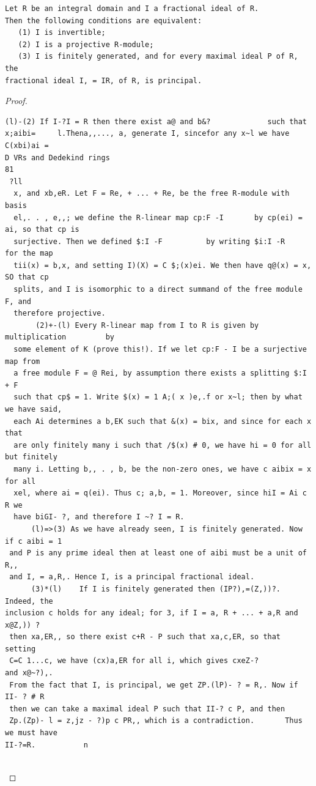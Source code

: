 \begin{theorem}\label{mcrt-auto-theorem-11-3}\uses{}
\begin{verbatim}
Let R be an integral domain and I a fractional ideal of R.
Then the following conditions are equivalent:
   (1) I is invertible;
   (2) I is a projective R-module;
   (3) I is finitely generated, and for every maximal ideal P of R, the
fractional ideal I, = IR, of R, is principal.
\end{verbatim}
\end{theorem}
\begin{proof}
\begin{verbatim}
(l)-(2) If I-?I = R then there exist a@ and b&?             such that
x;aibi=     l.Thena,,..., a, generate I, sincefor any x~l we have C(xbi)ai =
D VRs and Dedekind rings                                                 81
 ?ll
  x, and xb,eR. Let F = Re, + ... + Re, be the free R-module with basis
  el,. . , e,,; we define the R-linear map cp:F -I       by cp(ei) = ai, so that cp is
  surjective. Then we defined $:I -F          by writing $i:I -R         for the map
  tii(x) = b,x, and setting I)(X) = C $;(x)ei. We then have q@(x) = x, SO that cp
  splits, and I is isomorphic to a direct summand of the free module F, and
  therefore projective.
       (2)+-(l) Every R-linear map from I to R is given by multiplication         by
  some element of K (prove this!). If we let cp:F - I be a surjective map from
  a free module F = @ Rei, by assumption there exists a splitting $:I + F
  such that cp$ = 1. Write $(x) = 1 A;( x )e,.f or x~l; then by what we have said,
  each Ai determines a b,EK such that &(x) = bix, and since for each x that
  are only finitely many i such that /$(x) # 0, we have hi = 0 for all but finitely
  many i. Letting b,, . , b, be the non-zero ones, we have c aibix = x for all
  xel, where ai = q(ei). Thus c; a,b, = 1. Moreover, since hiI = Ai c R we
  have biGI- ?, and therefore I ~? I = R.
      (l)=>(3) As we have already seen, I is finitely generated. Now if c aibi = 1
 and P is any prime ideal then at least one of aibi must be a unit of R,,
 and I, = a,R,. Hence I, is a principal fractional ideal.
      (3)*(l)    If I is finitely generated then (IP?),=(Z,))?.         Indeed, the
inclusion c holds for any ideal; for 3, if I = a, R + ... + a,R and x@Z,)) ?
 then xa,ER,, so there exist c+R - P such that xa,c,ER, so that setting
 C=C 1...c, we have (cx)a,ER for all i, which gives cxeZ-?           and x@~?),.
 From the fact that I, is principal, we get ZP.(lP)- ? = R,. Now if II- ? # R
 then we can take a maximal ideal P such that II-? c P, and then
 Zp.(Zp)- l = z,jz - ?)p c PR,, which is a contradiction.       Thus we must have
II-?=R.           n


\end{verbatim}
\end{proof}
